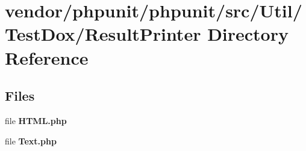 \section{vendor/phpunit/phpunit/src/\+Util/\+Test\+Dox/\+Result\+Printer Directory Reference}
\label{dir_470d2b3ce4033a398dd0c93c109784d6}
\subsection*{Files}
\begin{DoxyCompactItemize}
\item 
file {\bf H\+T\+M\+L.\+php}
\item 
file {\bf Text.\+php}
\end{DoxyCompactItemize}
